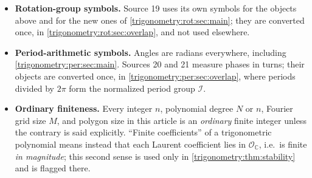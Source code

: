 \documentclass[11pt,letterpaper]{article}
\numberwithin{equation}{section}
\theoremstyle{definition}
\theoremstyle{remark}
\newcommand{\C}{\mathbb C}
\newcommand{\OO}{\mathcal O}
\newcommand{\cI}{\mathcal I}
\begin{document}
\begin{itemize}
 quotient by $h^m$ is finite; it is an algebraic size statement, not a statement about an ordinary
 integer tending to infinity.
\item \textbf{Rotation-group symbols.} Source 19 uses its own symbols for the objects above and
 for the new ones of \cref{trigonometry:rot:sec:main}; they are converted once, in
 \cref{trigonometry:rot:sec:overlap}, and not used elsewhere.
\item \textbf{Period-arithmetic symbols.} Angles are radians everywhere, including
 \cref{trigonometry:per:sec:main}. Sources 20 and 21 measure phases in turns; their objects are
 converted once, in \cref{trigonometry:per:sec:overlap}, where periods divided by $2\pi$ form the
 normalized period group $\cI$.
\item \textbf{Ordinary finiteness.} Every integer $n$, polynomial degree $N$ or $n$, Fourier grid
 size $M$, and polygon size in this article is an \emph{ordinary} finite integer unless the
 contrary is said explicitly. ``Finite coefficients'' of a trigonometric polynomial means instead
 that each Laurent coefficient lies in $\OO_{\C}$, i.e.\ is finite \emph{in magnitude}; this second
 sense is used only in \cref{trigonometry:thm:stability} and is flagged there.
\end{itemize}
\end{document}
